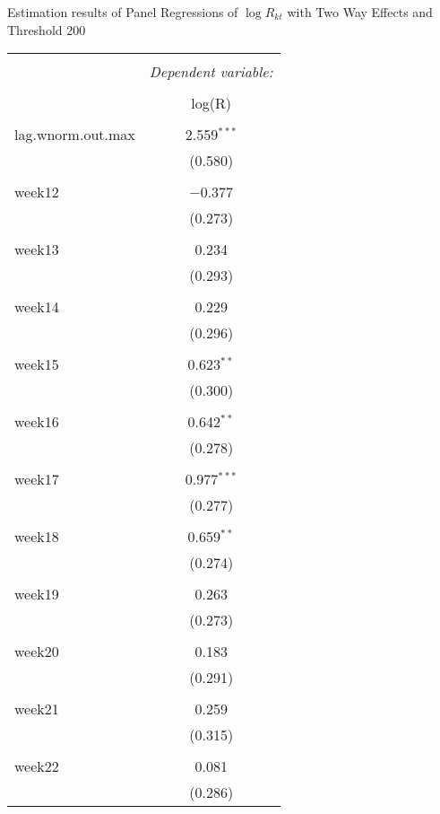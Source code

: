   \caption{Estimation results of Panel Regressions of $\log R_{kt}$ with Two Way Effects and Threshold 200} 
  \label{} 
\small 
\begin{tabular}{@{\extracolsep{5pt}}lc} 
\\[-1.8ex]\hline 
\hline \\[-1.8ex] 
 & \multicolumn{1}{c}{\textit{Dependent variable:}} \\ 
\cline{2-2} 
\\[-1.8ex] & log(R) \\ 
\hline \\[-1.8ex] 
 lag.wnorm.out.max & 2.559$^{***}$ \\ 
  & (0.580) \\ 
  & \\ 
 week12 & $-$0.377 \\ 
  & (0.273) \\ 
  & \\ 
 week13 & 0.234 \\ 
  & (0.293) \\ 
  & \\ 
 week14 & 0.229 \\ 
  & (0.296) \\ 
  & \\ 
 week15 & 0.623$^{**}$ \\ 
  & (0.300) \\ 
  & \\ 
 week16 & 0.642$^{**}$ \\ 
  & (0.278) \\ 
  & \\ 
 week17 & 0.977$^{***}$ \\ 
  & (0.277) \\ 
  & \\ 
 week18 & 0.659$^{**}$ \\ 
  & (0.274) \\ 
  & \\ 
 week19 & 0.263 \\ 
  & (0.273) \\ 
  & \\ 
 week20 & 0.183 \\ 
  & (0.291) \\ 
  & \\ 
 week21 & 0.259 \\ 
  & (0.315) \\ 
  & \\ 
 week22 & 0.081 \\ 
  & (0.286) \\ 

\end{tabular}
